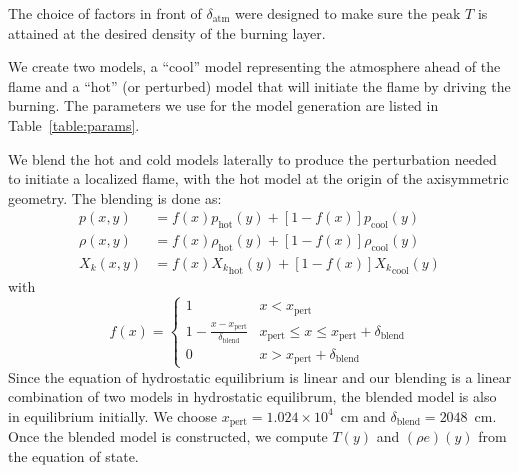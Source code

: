 \documentclass[twocolumn,times,tighten]{aastex62}
\newcommand{\MarginPar}[1]{\marginpar{\vskip-\baselineskip\raggedright\tiny\sffamily\hrule\smallskip{\color{red}#1}\par\smallskip\hrule}}
\begin{document}
The choice of factors in front of $\delta_\mathrm{atm}$ were designed
to make sure the peak $T$ is attained at the desired density 
of the burning layer.

We create two models, a ``cool'' model representing the atmosphere
ahead of the flame and a ``hot'' (or perturbed) model that will
initiate the flame by driving the burning.  The parameters we use for
the model generation are listed in Table~\ref{table:params}.

We blend the hot and cold models laterally to produce the perturbation
needed to initiate a localized flame, with the hot model at the
origin of the axisymmetric geometry.  The blending is done as:
\begin{align}
p(x,y) &= f(x) p_\mathrm{hot}(y) + [1-f(x)] p_\mathrm{cool}(y) \\
\rho(x,y) &= f(x) \rho_\mathrm{hot}(y) + [1-f(x)] \rho_\mathrm{cool}(y) \\
X_k(x,y) &= f(x) {X_k}_\mathrm{hot}(y) + [1-f(x)] {X_k}_\mathrm{cool}(y)
\end{align}
with
\begin{equation}
f(x) = \begin{cases}
     1 & x < x_\mathrm{pert} \\
   1 - \frac{x - x_\mathrm{pert}}{\delta_\mathrm{blend}} & x_\mathrm{pert} \le x \le x_\mathrm{pert} + \delta_\mathrm{blend} \\
     0 & x > x_\mathrm{pert} + \delta_\mathrm{blend}
\end{cases}
\end{equation}
Since the equation of hydrostatic equilibrium is linear and our
blending is a linear combination of two models in hydrostatic
equilibrum, the blended model is also in equilibrium initially.  We choose
$x_\mathrm{pert} = 1.024\times 10^4$~cm and $\delta_\mathrm{blend} = 2048$~cm.  Once
the blended model is constructed, we compute $T(y)$ and $(\rho e)(y)$
from the equation of state.  \MarginPar{show}
\end{document}
